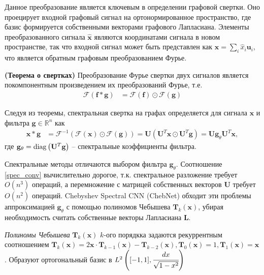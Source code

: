 \documentclass[12pt,twosides]{article}
\begin{document}
	Данное преобразование является ключевым в определении графовой свертки. Оно проецирует входной графовый сигнал на ортонормированное пространство, где базис формируется собственными векторами графового Лапласиана. Элементы преобразованного сигнала $ \hat{\mathbf{x}}$ являются координатами сигнала в новом пространстве, так что входной сигнал может быть представлен как $\mathbf{x}=\sum_{i} \hat{x}_{i} \mathbf{u}_{i}$, что является обратным графовым преобразованием Фурье.
	
	\begin{Theorem}
		\textbf{(Теорема о свертках)}\cite{10.5555/1525499} Преобразование Фурье свертки двух сигналов является покомпонентным произведением их преобразований Фурье, т.е. $$\begin{aligned}\mathscr{F}\left( \mathbf{f} * \mathbf{g}\right) &=\mathscr{F}(\mathbf{f}) \odot \mathscr{F}(\mathbf{g}) \end{aligned}$$
	\end{Theorem}

	Следуя из теоремы, спектральная свертка на графах определяется для сигнала $\mathbf{x}$ и фильтра $\mathbf{g} \in \mathbb{R}^{n}$ как 
	\begin{align}
	\mathbf{x} * \mathbf{g} &=\mathscr{F}^{-1}(\mathscr{F}(\mathbf{x}) \odot \mathscr{F}(\mathbf{g})) =\mathbf{U}\left(\mathbf{U}^{T} \mathbf{x} \odot \mathbf{U}^{T} \mathbf{g}\right) = \mathbf{U g}_{\theta} \mathbf{U}^{T} \mathbf{x},\label{spec_conv}
	\end{align}
	где $\mathbf{g}_{\theta} = \diag\left(\mathbf{U}^{T} \mathbf{g}\right)$ -- спектральные коэффициенты фильтра.
	
	Спектральные методы отличаются выбором фильтра $\mathbf{g}_{\theta}$. Соотношение \ref{spec_conv} вычислительно дорогое, т.к. спектральное разложение требует $O\left(n^{3}\right)$ операций, а перемножение с матрицей собственных векторов $\mathbf{U}$ требует $O\left(n^{2}\right)$ операций. Chebyshev Spectral CNN (ChebNet) \cite{NIPS2016_6081} обходит эти проблемы аппроксимацией $\mathbf{g}_{\theta}$ с помощью полиномов Чебышева $\mathbf{T}_k\mathbf{(x)}$, убирая необходимость считать собственные векторы Лапласиана $\mathbf{L}$.
	
	\begin{Def}
		\textit{Полиномы Чебышева} $\mathbf{T}_k\mathbf{(x)}$ $k$-ого порядкка задаются рекуррентным соотношением  $ \mathbf{T}_{k}(\mathbf{x})=2 \mathbf{x} \cdot \mathbf{T}_{k-1}(\mathbf{x})-\mathbf{T}_{k-2}(\mathbf{x}), \mathbf{T}_{0}(\mathbf{x})=1, \mathbf{T}_{1}(\mathbf{x})=\mathbf{x}$. Образуют ортогональный базис в $L^{2}\left([-1,1], \cfrac{d x} {\sqrt{1-x^{2}}}\right)$
	\end{Def}
\end{document}
